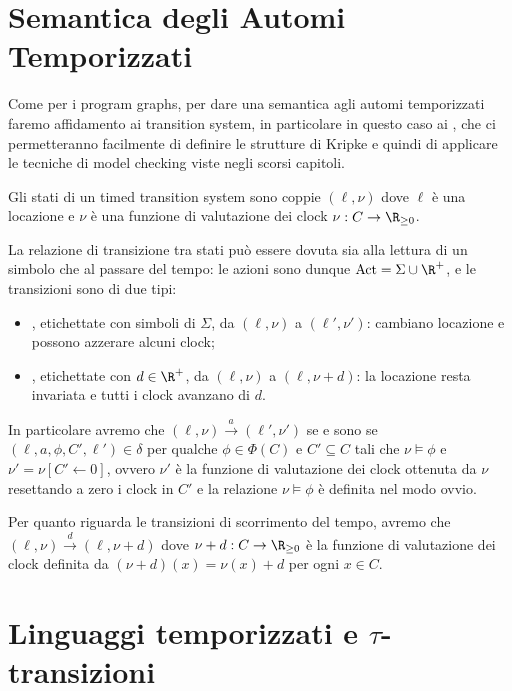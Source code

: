 \section{Semantica degli Automi Temporizzati}

Come per i program graphs, per dare una semantica agli automi temporizzati faremo affidamento ai transition system, in particolare in questo caso ai , che ci permetteranno facilmente di definire le strutture di Kripke e quindi di applicare le tecniche di model checking viste negli scorsi capitoli.

Gli stati di un timed transition system sono coppie \((\ell, \nu)\) dove \(\ell\) è una locazione e \(\nu\) è una funzione di valutazione dei clock \(\nu: C \to \R_{\ge 0}\).

La relazione di transizione tra stati può essere dovuta sia alla lettura di un simbolo che al passare del tempo: le azioni sono dunque \(\Act = \Sigma \cup \R^+\), e le transizioni sono di due tipi:
\begin{itemize}
  \item {}, etichettate con simboli di \(\Sigma\), da \((\ell,\nu)\) a \((\ell',\nu')\): cambiano locazione e possono azzerare alcuni clock;
  \item {}, etichettate con \(d \in \R^+\), da \((\ell,\nu)\) a \((\ell,\nu + d)\): la locazione resta invariata e tutti i clock avanzano di \(d\).
\end{itemize}

In particolare avremo che \((\ell,\nu) \xrightarrow{a} (\ell',\nu')\) se e sono se \((\ell, a,\phi, C',\ell') \in \delta\) per qualche \(\phi \in \Phi(C)\) e \(C'\subseteq C\) tali che \(\nu \models \phi\) e \(\nu' = \nu[C' \gets 0]\), ovvero \(\nu'\) è la funzione di valutazione dei clock ottenuta da \(\nu\) resettando a zero i clock in \(C'\) e la relazione \(\nu \models \phi\) è definita nel modo ovvio.

Per quanto riguarda le transizioni di scorrimento del tempo, avremo che \((\ell,\nu) \xrightarrow{d} (\ell,\nu + d)\) dove \(\nu + d: C \to \R_{\ge 0}\) è la funzione di valutazione dei clock definita da \((\nu + d)(x) = \nu(x) + d\) per ogni \(x \in C\).

\section{Linguaggi temporizzati e \texorpdfstring{\(\tau\)}{tau}-transizioni}

